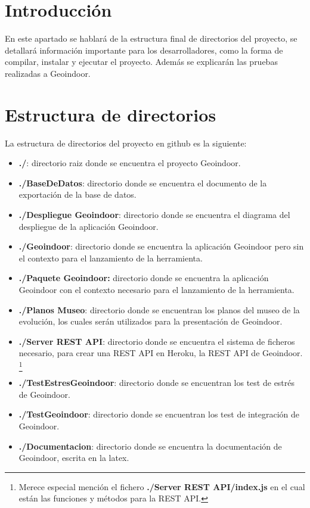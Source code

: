 
\section{Introducción}

En este apartado se hablará de la estructura final de directorios del proyecto, se detallará información importante para los desarrolladores, como la forma de compilar, instalar y ejecutar el proyecto. Además se explicarán las pruebas realizadas a Geoindoor.

\section{Estructura de directorios}

La estructura de directorios del proyecto en github es la siguiente:

\begin{itemize}
	\item \textbf{./}: directorio raiz donde se encuentra el proyecto Geoindoor.
	\item \textbf{./BaseDeDatos}: directorio donde se encuentra el documento de la exportación de la base de datos.
	\item \textbf{./Despliegue Geoindoor}: directorio donde se encuentra el diagrama del despliegue de la aplicación Geoindoor.
	\item \textbf{./Geoindoor}: directorio donde se encuentra la aplicación Geoindoor pero sin el contexto para el lanzamiento de la herramienta.
	\item  \textbf{./Paquete Geoindoor:} directorio donde se encuentra la aplicación Geoindoor con el contexto necesario para el lanzamiento de la herramienta.
	\item \textbf{./Planos Museo}: directorio donde se encuentran los planos del museo de la evolución, los cuales serán utilizados para la presentación de Geoindoor.
	\item \textbf{./Server REST API}: directorio donde se encuentra el sistema de ficheros necesario, para crear una REST API en Heroku, la REST API de Geoindoor.
	\footnote{Merece especial mención el fichero \textbf{./Server REST API/index.js} en el cual están las funciones y métodos para la REST API.}
	\item \textbf{./TestEstresGeoindoor}: directorio donde se encuentran los test de estrés de Geoindoor.
	\item \textbf{./TestGeoindoor}: directorio donde se encuentran los test de integración de Geoindoor.
	\item \textbf{./Documentacion}: directorio donde se encuentra la documentación de Geoindoor, escrita en la latex.
\end{itemize}

